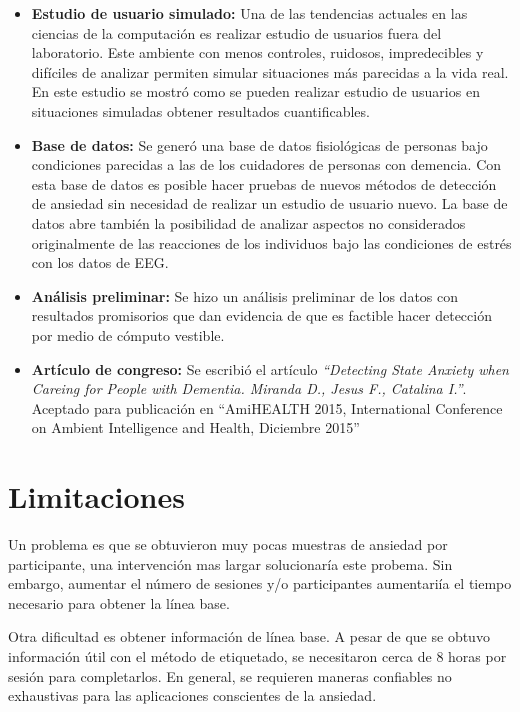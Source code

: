 	\begin{itemize}
		\item \textbf{Estudio de usuario simulado:} Una de las tendencias actuales en las ciencias de la computaci\'on es realizar estudio de usuarios fuera del laboratorio. Este ambiente con menos controles, ruidosos, impredecibles y dif\'iciles de analizar permiten simular situaciones m\'as parecidas a la vida real. En este estudio se mostr\'o como se pueden realizar estudio de usuarios en situaciones simuladas obtener resultados cuantificables.

	\item \textbf{Base de datos:} Se gener\'o una base de datos fisiol\'ogicas de personas bajo condiciones parecidas a las de los cuidadores de personas con demencia. Con esta base de datos es posible hacer pruebas de nuevos m\'etodos de detecci\'on de ansiedad sin necesidad de realizar un estudio de usuario nuevo. La base de datos abre tambi\'en la posibilidad de analizar aspectos no considerados originalmente de las reacciones de los individuos bajo las condiciones de estr\'es con los datos de EEG.

	\item \textbf{An\'alisis preliminar:} Se hizo un an\'alisis preliminar de los datos con resultados promisorios que dan evidencia de que es factible hacer detecci\'on por medio de c\'omputo vestible.
	\item \textbf{Art\'iculo de congreso:} Se escribi\'o el art\'iculo \textit{``Detecting State Anxiety when Careing for People with Dementia. Miranda D., Jesus F., Catalina I.''}. Aceptado para publicaci\'on en ``AmiHEALTH 2015, International Conference on Ambient Intelligence and Health, Diciembre 2015''
	\end{itemize}
\section{Limitaciones}
        Un problema es que se obtuvieron muy pocas muestras de ansiedad por participante, una intervenci\'on mas largar solucionar\'ia este probema. Sin embargo, aumentar el n\'umero de sesiones y/o participantes aumentari\'ia el tiempo necesario para obtener la l\'inea base.

	Otra dificultad es obtener informaci\'on de l\'inea base. A pesar de que se obtuvo informaci\'on \'util con el m\'etodo de etiquetado, se necesitaron cerca de 8 horas por sesi\'on para completarlos. En general, se requieren maneras confiables no exhaustivas para las aplicaciones conscientes de la ansiedad.

